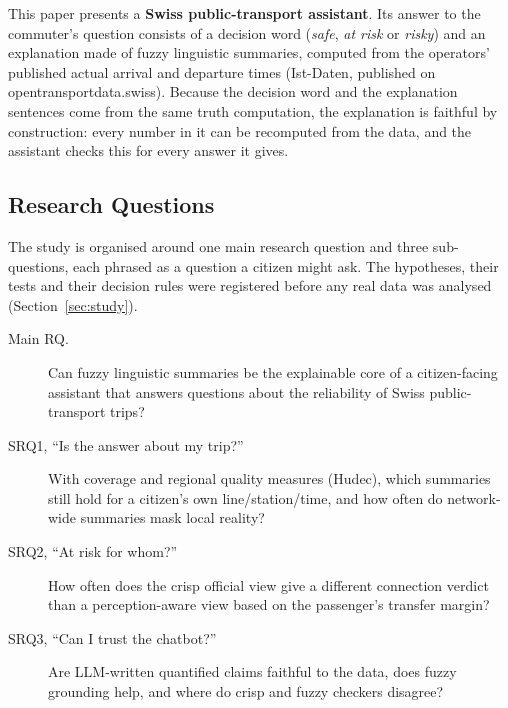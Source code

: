 This paper presents a \textbf{Swiss public-transport assistant}. Its answer to the
commuter's question consists of a decision word (\emph{safe}, \emph{at risk} or
\emph{risky}) and an explanation made of fuzzy linguistic summaries, computed from the
operators' published actual arrival and departure times (Ist-Daten, published on
opentransportdata.swiss). Because the decision word and the explanation sentences come from
the same truth computation, the explanation is faithful by construction: every number in it
can be recomputed from the data, and the assistant checks this for every answer it gives.

\subsection{Research Questions}
\label{sec:rq}
The study is organised around one main research question and three sub-questions, each
phrased as a question a citizen might ask. The hypotheses, their tests and their decision
rules were registered before any real data was analysed (Section~\ref{sec:study}).

\begin{description}
  \item[Main RQ.] Can fuzzy linguistic summaries be the explainable core of a
  citizen-facing assistant that answers questions about the reliability of Swiss
  public-transport trips?
  \item[SRQ1, ``Is the answer about my trip?''] With coverage and regional quality measures
  (Hudec), which summaries still hold for a citizen's own line/station/time, and how often
  do network-wide summaries mask local reality?
  \item[SRQ2, ``At risk for whom?''] How often does the crisp official view give a
  different connection verdict than a perception-aware view based on the passenger's
  transfer margin?
  \item[SRQ3, ``Can I trust the chatbot?''] Are LLM-written quantified claims faithful to
  the data, does fuzzy grounding help, and where do crisp and fuzzy checkers disagree?
\end{description}

